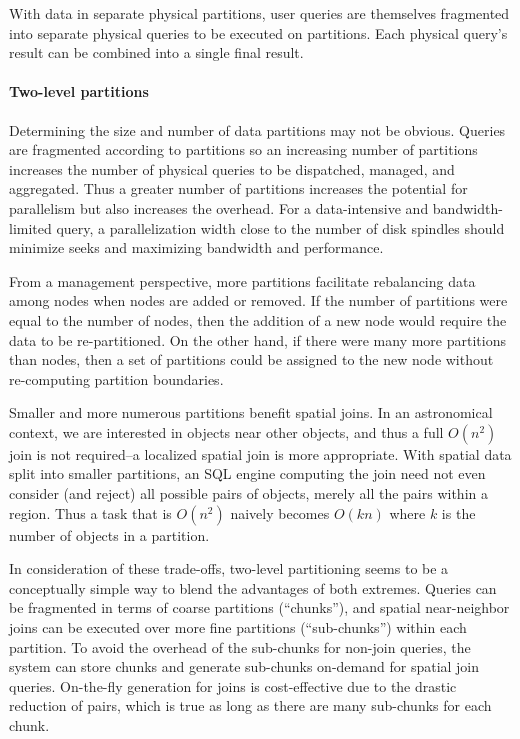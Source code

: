 \documentclass[DM,lsstdraft,toc]{lsstdoc}
\begin{document}
With data in separate physical partitions, user queries are themselves
fragmented into separate physical queries to be executed on partitions.
Each physical query's result can be combined into a single final result.

\paragraph{Two-level partitions}\label{two-level-partitions}

Determining the size and number of data partitions may not be obvious.
Queries are fragmented according to partitions so an increasing number
of partitions increases the number of physical queries to be dispatched,
managed, and aggregated. Thus a greater number of partitions increases
the potential for parallelism but also increases the overhead. For a
data-intensive and bandwidth-limited query, a parallelization width
close to the number of disk spindles should minimize seeks and
maximizing bandwidth and performance.

From a management perspective, more partitions facilitate rebalancing
data among nodes when nodes are added or removed. If the number of
partitions were equal to the number of nodes, then the addition of a new
node would require the data to be re-partitioned. On the other hand, if
there were many more partitions than nodes, then a set of partitions
could be assigned to the new node without re-computing partition
boundaries.

Smaller and more numerous partitions benefit spatial joins. In an
astronomical context, we are interested in objects near other objects,
and thus a full \(O(n^2)\) join is not required--a localized spatial
join is more appropriate. With spatial data split into smaller
partitions, an SQL engine computing the join need not even consider (and
reject) all possible pairs of objects, merely all the pairs within a
region. Thus a task that is \(O(n^2)\) naively becomes \(O(kn)\) where
\(k\) is the number of objects in a partition.

In consideration of these trade-offs, two-level partitioning seems to be
a conceptually simple way to blend the advantages of both extremes.
Queries can be fragmented in terms of coarse partitions (``chunks''),
and spatial near-neighbor joins can be executed over more fine
partitions (``sub-chunks'') within each partition. To avoid the overhead
of the sub-chunks for non-join queries, the system can store chunks and
generate sub-chunks on-demand for spatial join queries. On-the-fly
generation for joins is cost-effective due to the drastic reduction of
pairs, which is true as long as there are many sub-chunks for each
chunk.
\end{document}

